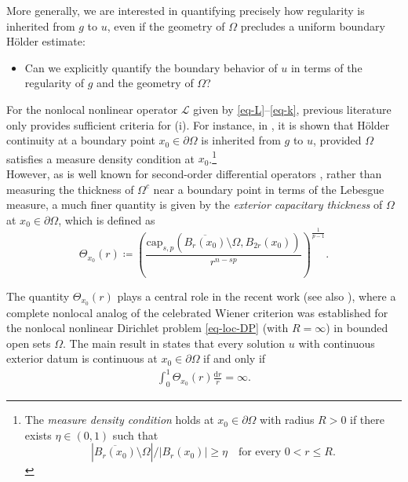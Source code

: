 \documentclass[11pt]{amsart}
\theoremstyle{plain}
\theoremstyle{definition}
\numberwithin{equation}{section}
\begin{document}
More generally, we are interested in quantifying precisely how regularity is inherited from $g$ to $u$, even if the geometry of $\Omega$ precludes a uniform boundary H\"older estimate:
\begin{itemize}
    \item[(ii)] Can we explicitly quantify the boundary behavior of $u$ in terms of the regularity of $g$ and the geometry of $\Omega$?
\end{itemize}

For the nonlocal nonlinear operator $\mathcal{L}$ given by \eqref{eq-L}--\eqref{eq-k}, previous literature only provides sufficient criteria for (i). For instance, in \cite{KKP16,LZLH20}, it is shown that H\"older continuity at a boundary point $x_0 \in \partial \Omega$ is inherited from $g$ to $u$, provided $\Omega$ satisfies a measure density condition at $x_0$.\footnote{The \emph{measure density condition} holds at $x_0 \in \partial \Omega$ with radius $R>0$ if there exists $\eta \in (0,1)$ such that
\begin{equation}\label{eq-MDC}\tag{MDC}
|\overline{B_r(x_0)} \setminus \Omega |/|B_r(x_0)| \ge \eta \quad\text{for every }0<r\leq R.
\end{equation}} \\

However, as is well known for second-order differential operators \cite{HKM06}, rather than measuring the thickness of $\Omega^c$ near a boundary point in terms of the Lebesgue measure, a much finer quantity is given by the \emph{exterior capacitary thickness} of $\Omega$ at $x_0 \in \partial \Omega$, which is defined as
\begin{equation*}
\Theta_{x_0}(r) \coloneqq \left(\frac{\mathrm{cap}_{s, p}(\overline{B_{r}(x_0)} \setminus \Omega, B_{2r}(x_0))}{r^{n-sp}} \right)^{\frac{1}{p-1}}.
\end{equation*}

The quantity $\Theta_{x_0}(r)$ plays a central role in the recent work \cite{KLL23} (see also \cite{Bjo24,KL23,KLL25}), where a complete nonlocal analog of the celebrated Wiener criterion was established for the nonlocal nonlinear Dirichlet problem \eqref{eq-loc-DP} (with $R=\infty$) in bounded open sets $\Omega$. The main result in \cite{KLL23} states that every solution $u$ with continuous exterior datum is continuous at $x_0 \in \partial \Omega$ if and only if
\begin{align}
\label{eq-Wiener}
    \int_0^1 \Theta_{x_0}(r) \frac{\mathrm{d}r}{r} = \infty.
\end{align}
\end{document}
